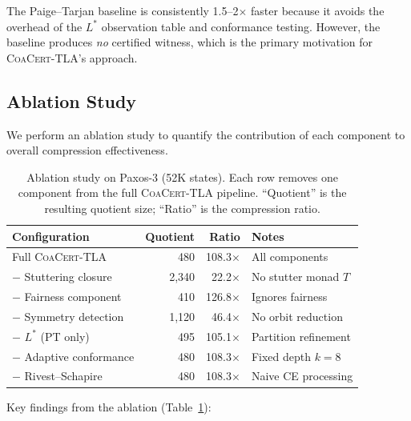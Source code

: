\documentclass[11pt]{article}
\newcommand{\CoaCert}{\textsc{CoaCert-TLA}}
\begin{document}
The Paige--Tarjan baseline is consistently 1.5--2$\times$ faster because
it avoids the overhead of the $L^*$ observation table and conformance
testing.
However, the baseline produces \emph{no} certified witness, which is
the primary motivation for \CoaCert{}'s approach.

\subsection{Ablation Study}

We perform an ablation study to quantify the contribution of each component
to overall compression effectiveness.

\begin{table}[t]
\centering
\caption{Ablation study on Paxos-3 (52K states).  Each row removes one
  component from the full \CoaCert{} pipeline.  ``Quotient'' is the
  resulting quotient size; ``Ratio'' is the compression ratio.}
\label{tab:ablation}
\small
\begin{tabular}{@{}lrrl@{}}
\toprule
\textbf{Configuration} & \textbf{Quotient} & \textbf{Ratio} &
  \textbf{Notes} \\
\midrule
Full \CoaCert{}               &    480 & 108.3$\times$ & All components \\
$-$ Stuttering closure        &  2{,}340 &  22.2$\times$ & No stutter monad $T$ \\
$-$ Fairness component        &    410 & 126.8$\times$ & Ignores fairness \\
$-$ Symmetry detection        &  1{,}120 &  46.4$\times$ & No orbit reduction \\
$-$ $L^*$ (PT only)           &    495 & 105.1$\times$ & Partition refinement \\
$-$ Adaptive conformance      &    480 & 108.3$\times$ & Fixed depth $k=8$ \\
$-$ Rivest--Schapire          &    480 & 108.3$\times$ & Naive CE processing \\
\bottomrule
\end{tabular}
\end{table}

Key findings from the ablation (Table~\ref{tab:ablation}):
\end{document}
